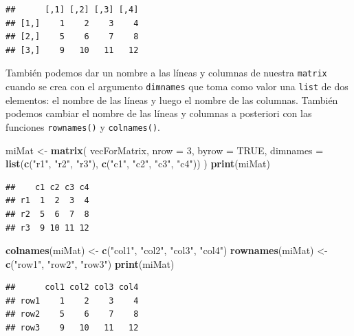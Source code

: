 \documentclass[]{book}
\newenvironment{Shaded}{\begin{snugshade}}{\end{snugshade}}
\newcommand{\KeywordTok}[1]{\textcolor[rgb]{0.13,0.29,0.53}{\textbf{#1}}}
\newcommand{\DataTypeTok}[1]{\textcolor[rgb]{0.13,0.29,0.53}{#1}}
\newcommand{\DecValTok}[1]{\textcolor[rgb]{0.00,0.00,0.81}{#1}}
\newcommand{\StringTok}[1]{\textcolor[rgb]{0.31,0.60,0.02}{#1}}
\newcommand{\OtherTok}[1]{\textcolor[rgb]{0.56,0.35,0.01}{#1}}
\newcommand{\NormalTok}[1]{#1}
\begin{document}
\begin{verbatim}
##      [,1] [,2] [,3] [,4]
## [1,]    1    2    3    4
## [2,]    5    6    7    8
## [3,]    9   10   11   12
\end{verbatim}

También podemos dar un nombre a las líneas y columnas de nuestra
\texttt{matrix} cuando se crea con el argumento \texttt{dimnames} que
toma como valor una \texttt{list} de dos elementos: el nombre de las
líneas y luego el nombre de las columnas. También podemos cambiar el
nombre de las líneas y columnas a posteriori con las funciones
\texttt{rownames()} y \texttt{colnames()}.

\begin{Shaded}
\begin{Highlighting}[]
\NormalTok{miMat <-}\StringTok{ }\KeywordTok{matrix}\NormalTok{(}
\NormalTok{  vecForMatrix, }
  \DataTypeTok{nrow =} \DecValTok{3}\NormalTok{, }
  \DataTypeTok{byrow =} \OtherTok{TRUE}\NormalTok{, }
  \DataTypeTok{dimnames =} \KeywordTok{list}\NormalTok{(}\KeywordTok{c}\NormalTok{(}\StringTok{"r1"}\NormalTok{, }\StringTok{"r2"}\NormalTok{, }\StringTok{"r3"}\NormalTok{), }\KeywordTok{c}\NormalTok{(}\StringTok{"c1"}\NormalTok{, }\StringTok{"c2"}\NormalTok{, }\StringTok{"c3"}\NormalTok{, }\StringTok{"c4"}\NormalTok{))}
\NormalTok{)}
\KeywordTok{print}\NormalTok{(miMat)}
\end{Highlighting}
\end{Shaded}

\begin{verbatim}
##    c1 c2 c3 c4
## r1  1  2  3  4
## r2  5  6  7  8
## r3  9 10 11 12
\end{verbatim}

\begin{Shaded}
\begin{Highlighting}[]
\KeywordTok{colnames}\NormalTok{(miMat) <-}\StringTok{ }\KeywordTok{c}\NormalTok{(}\StringTok{"col1"}\NormalTok{, }\StringTok{"col2"}\NormalTok{, }\StringTok{"col3"}\NormalTok{, }\StringTok{"col4"}\NormalTok{)}
\KeywordTok{rownames}\NormalTok{(miMat) <-}\StringTok{ }\KeywordTok{c}\NormalTok{(}\StringTok{"row1"}\NormalTok{, }\StringTok{"row2"}\NormalTok{, }\StringTok{"row3"}\NormalTok{)}
\KeywordTok{print}\NormalTok{(miMat)}
\end{Highlighting}
\end{Shaded}

\begin{verbatim}
##      col1 col2 col3 col4
## row1    1    2    3    4
## row2    5    6    7    8
## row3    9   10   11   12
\end{verbatim}
\end{document}
